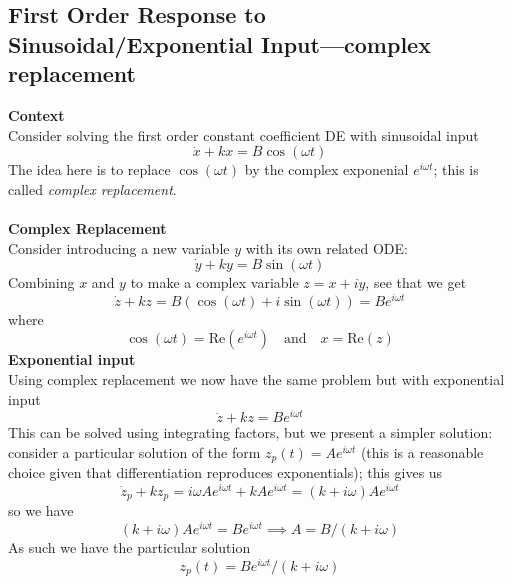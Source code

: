 \documentclass{report}
\begin{document}
\subsection{First Order Response to Sinusoidal/Exponential Input---complex replacement}
\textbf{Context}\\
Consider solving the first order constant coefficient DE with sinusoidal input
\begin{equation*}
\dot{x}+kx=B\cos(\omega t)
\end{equation*}
The idea here is to replace $\cos(\omega t)$ by the complex exponenial $e^{i\omega t}$; this is called
\textit{complex replacement}.\\
\vspace{1mm}\\
\textbf{Complex Replacement}\\
Consider introducing a new variable $y$ with its own related ODE:
\begin{equation*}
\dot{y}+ky=B\sin(\omega t)
\end{equation*}
Combining $x$ and $y$ to make a complex variable $z=x+iy$, see that we get
\begin{equation*}
\dot{z}+kz=B(\cos(\omega t)+i\sin(\omega t))=Be^{i\omega t}
\end{equation*}
where
\begin{equation*}
\cos(\omega t)=\text{Re}(e^{i\omega t})\quad\text{and}\quad x=\text{Re}(z)
\end{equation*}
\textbf{Exponential input}\\
Using complex replacement we now have the same problem but with exponential input
\begin{equation*}
\dot{z}+kz=Be^{i\omega t}
\end{equation*}
This can be solved using integrating factors, but we present a simpler solution: consider a particular solution of 
the form $z_p(t)=Ae^{i\omega t}$ (this is a reasonable choice given that differentiation reproduces exponentials); 
this gives us
\begin{equation*}
\dot{z}_p+kz_p=i\omega Ae^{i\omega t}+kAe^{i\omega t}
=(k+i\omega)Ae^{i\omega t}
\end{equation*}
so we have
\begin{equation*}
(k+i\omega)Ae^{i\omega t}=Be^{i\omega t}\implies A=B/(k+i\omega)
\end{equation*}
As such we have the particular solution
\begin{equation*}
z_p(t)=Be^{i\omega t}/(k+i\omega)
\end{equation*}
\end{document}

